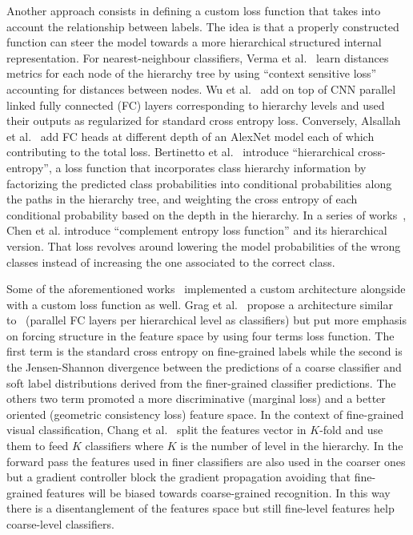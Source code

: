 Another approach consists in defining a custom loss function that takes into
account the relationship between labels. The idea is that a properly constructed
function can steer the model towards a more hierarchical structured internal
representation. For nearest-neighbour classifiers, Verma et
al.~\cite{LearningHierarVerma2012} learn distances metrics for each node of the
hierarchy tree by using ``context sensitive loss'' accounting for distances
between nodes. Wu et al.~\cite{LearningToMakWuHu2016} add on top of CNN parallel
linked fully connected (FC) layers corresponding to hierarchy levels and used
their outputs as regularized for standard cross entropy loss. Conversely,
Alsallah et al.~\cite{DoConvolutionaAlsall2017} add FC heads at different depth
of an AlexNet model each of which contributing to the total loss. Bertinetto et
al.~\cite{MakingBetterMBertin2019} introduce ``hierarchical cross-entropy'', a
loss function that incorporates class hierarchy information by factorizing the
predicted class probabilities into conditional probabilities along the paths in
the hierarchy tree, and weighting the cross entropy of each conditional
probability based on the depth in the hierarchy. In a series of
works~\cite{ComplementObjeChen2019, ImprovingAdverChen2019,
LearningWithHChen2019}, Chen et al. introduce ``complement entropy loss
function'' and its hierarchical version. That loss revolves around lowering the
model probabilities of the wrong classes instead of increasing the one
associated to the correct class.

Some of the aforementioned works~\cite{LearningToMakWuHu2016,
DoConvolutionaAlsall2017} implemented a custom architecture alongside with a
custom loss function as well. Grag et al.~\cite{LearningHierarGarg2022} propose
a architecture similar to~\cite{LearningToMakWuHu2016} (parallel FC layers per
hierarchical level as classifiers) but put more emphasis on forcing structure
in the feature space by using four terms loss function. The first term is the
standard cross entropy on fine-grained labels while the second is the
Jensen-Shannon divergence between the predictions of a coarse classifier and
soft label distributions derived from the finer-grained classifier predictions.
The others two term promoted a more discriminative (marginal loss) and a better
oriented (geometric consistency loss) feature space. In the context of
fine-grained visual classification, Chang et al.~\cite{YourFlamingoChang2020}
split the features vector in $K$-fold and use them to feed $K$ classifiers
where $K$ is the number of level in the hierarchy. In the forward pass the
features used in finer classifiers are also used in the coarser ones but a
gradient controller block the gradient propagation avoiding that fine-grained
features will be biased towards coarse-grained recognition. In this way there
is a disentanglement of the features space but still fine-level features help
coarse-level classifiers.

